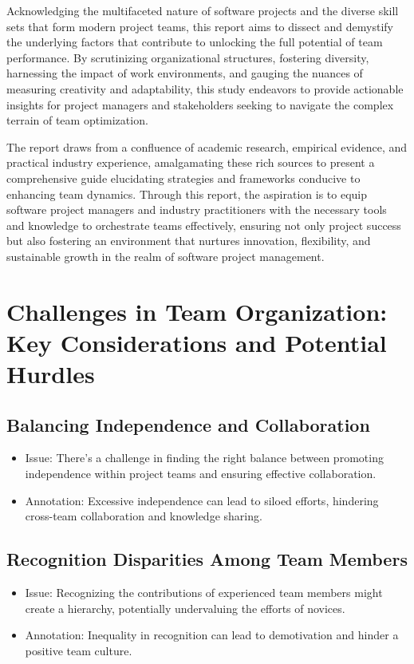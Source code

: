 \documentclass[a4paper, twoside]{article}
\begin{document}
Acknowledging the multifaceted nature of software projects and the diverse skill sets that form modern project teams, this report aims to dissect and demystify the underlying factors that contribute to unlocking the full potential of team performance. By scrutinizing organizational structures, fostering diversity, harnessing the impact of work environments, and gauging the nuances of measuring creativity and adaptability, this study endeavors to provide actionable insights for project managers and stakeholders seeking to navigate the complex terrain of team optimization.

The report draws from a confluence of academic research, empirical evidence, and practical industry experience, amalgamating these rich sources to present a comprehensive guide elucidating strategies and frameworks conducive to enhancing team dynamics. Through this report, the aspiration is to equip software project managers and industry practitioners with the necessary tools and knowledge to orchestrate teams effectively, ensuring not only project success but also fostering an environment that nurtures innovation, flexibility, and sustainable growth in the realm of software project management.


\section{Challenges in Team Organization: Key Considerations and Potential Hurdles}
\subsection{Balancing Independence and Collaboration}
\begin{itemize}
  \item{Issue}: There's a challenge in finding the right balance between promoting independence within project teams and ensuring effective collaboration.
  \item{Annotation}: Excessive independence can lead to siloed efforts, hindering cross-team collaboration and knowledge sharing.\cite{Tuckman1965}
\end{itemize}

\subsection{Recognition Disparities Among Team Members}
\begin{itemize}
  \item{Issue}: Recognizing the contributions of experienced team members might create a hierarchy, potentially undervaluing the efforts of novices.
  \item{Annotation}: Inequality in recognition can lead to demotivation and hinder a positive team culture.\cite{Deci2001}
\end{itemize}
\end{document}
